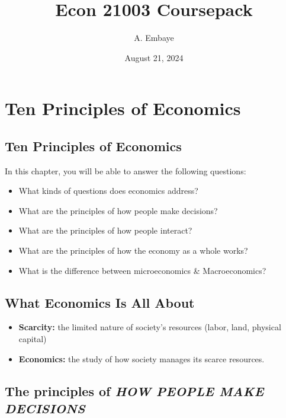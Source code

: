 \documentclass[
]{book}
\title{Econ 21003 Coursepack}
\author{A. Embaye}
\date{August 21, 2024}
\begin{document}
\maketitle

{
\setcounter{tocdepth}{1}
\tableofcontents
}
\hypertarget{ten-principles-of-economics}{%
\chapter{Ten Principles of Economics}\label{ten-principles-of-economics}}

\hypertarget{ten-principles-of-economics-1}{%
\section{Ten Principles of Economics}\label{ten-principles-of-economics-1}}

In this chapter, you will be able to answer the following questions:

\begin{itemize}
\item
  What kinds of questions does economics address?
\item
  What are the principles of how people make decisions?
\item
  What are the principles of how people interact?
\item
  What are the principles of how the economy as a whole works?
\item
  What is the difference between microeconomics \& Macroeconomics?
\end{itemize}

\hypertarget{what-economics-is-all-about}{%
\section{What Economics Is All About}\label{what-economics-is-all-about}}

\begin{itemize}
\item
  \textbf{Scarcity:} the limited nature of society's resources (labor, land, physical capital)
\item
  \textbf{Economics:} the study of how society manages its scarce resources.
\end{itemize}

\hypertarget{the-principles-of-how-people-make-decisions}{%
\section{\texorpdfstring{The principles of \textbf{\emph{HOW PEOPLE MAKE DECISIONS}}}{The principles of HOW PEOPLE MAKE DECISIONS}}\label{the-principles-of-how-people-make-decisions}}
\end{document}
